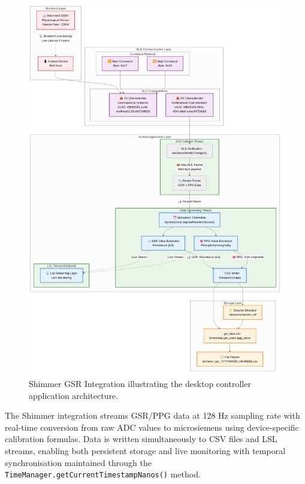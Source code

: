 \begin{figure}[htbp]
    \centering
    \includegraphics[width=\textwidth]{../../diagrams/fig_4_03_shimmer_gsr_integration.png}
    \caption{Shimmer GSR Integration illustrating the desktop controller application architecture.}
    \label{fig:4_03_shimmer_gsr_integration}
\end{figure}

The Shimmer integration streams GSR/PPG data at 128 Hz sampling rate with real-time conversion from raw ADC values to microsiemens using device-specific calibration formulas. Data is written simultaneously to CSV files and LSL streams, enabling both persistent storage and live monitoring with temporal synchronisation maintained through the \texttt{TimeManager.getCurrentTimestampNanos()} method.


